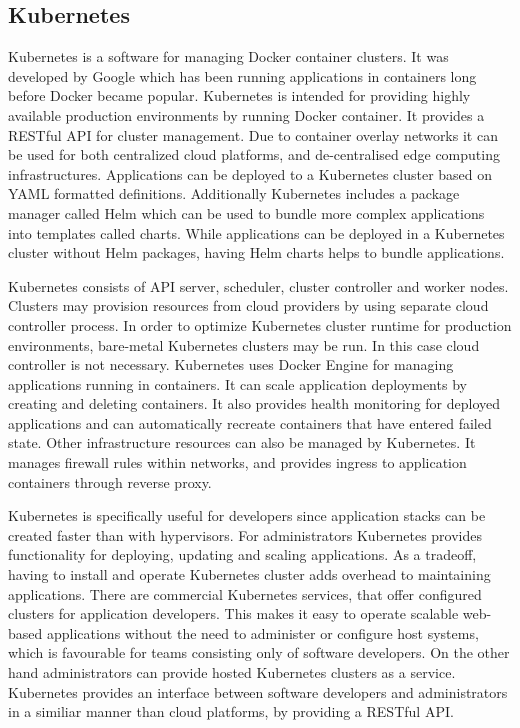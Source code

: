 \subsection{Kubernetes}

Kubernetes \cite{burns2016borg} is a software for managing Docker container
clusters. It was developed by Google which has been running applications in
containers long before Docker became popular. Kubernetes is intended for
providing highly available production environments by running Docker container.
It provides a RESTful API for cluster management. Due to container overlay
networks it can be used for both centralized cloud platforms, and
de-centralised edge computing infrastructures. Applications can be deployed to
a Kubernetes cluster based on YAML formatted definitions. Additionally
Kubernetes includes a package manager called Helm  which can be used to bundle
more complex applications into templates called charts. While applications can
be deployed in a Kubernetes cluster without Helm packages, having Helm charts
helps to bundle applications.

Kubernetes consists of API server, scheduler, cluster controller and worker
nodes. Clusters may provision resources from cloud providers by using separate
cloud controller process. In order to optimize Kubernetes cluster runtime for
production environments, bare-metal Kubernetes clusters may be run. In this
case cloud controller is not necessary. Kubernetes uses Docker Engine for
managing applications running in containers. It can scale application
deployments by creating and deleting containers. It also provides health
monitoring for deployed applications and can automatically recreate containers
that have entered failed state. Other infrastructure resources can also be
managed by Kubernetes. It manages firewall rules within networks, and provides
ingress to application containers through reverse proxy.

Kubernetes is specifically useful for developers since application stacks can
be created faster than with hypervisors. For administrators Kubernetes provides
functionality for deploying, updating and scaling applications. As a tradeoff,
having to install and operate Kubernetes cluster adds overhead to maintaining
applications. There are commercial Kubernetes services, that offer configured
clusters for application developers. This makes it easy to operate scalable
web-based applications without the need to administer or configure host
systems, which is favourable for teams consisting only of software developers.
On the other hand administrators can provide hosted Kubernetes clusters as a
service. Kubernetes provides an interface between software developers and
administrators in a similiar manner than cloud platforms, by providing a
RESTful API.

